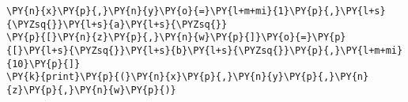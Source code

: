 \begin{Verbatim}[commandchars=\\\{\}]
\PY{n}{x}\PY{p}{,}\PY{n}{y}\PY{o}{=}\PY{l+m+mi}{1}\PY{p}{,}\PY{l+s}{\PYZsq{}}\PY{l+s}{a}\PY{l+s}{\PYZsq{}}
\PY{p}{[}\PY{n}{z}\PY{p}{,}\PY{n}{w}\PY{p}{]}\PY{o}{=}\PY{p}{[}\PY{l+s}{\PYZsq{}}\PY{l+s}{b}\PY{l+s}{\PYZsq{}}\PY{p}{,}\PY{l+m+mi}{10}\PY{p}{]}
\PY{k}{print}\PY{p}{(}\PY{n}{x}\PY{p}{,}\PY{n}{y}\PY{p}{,}\PY{n}{z}\PY{p}{,}\PY{n}{w}\PY{p}{)}
\end{Verbatim}
